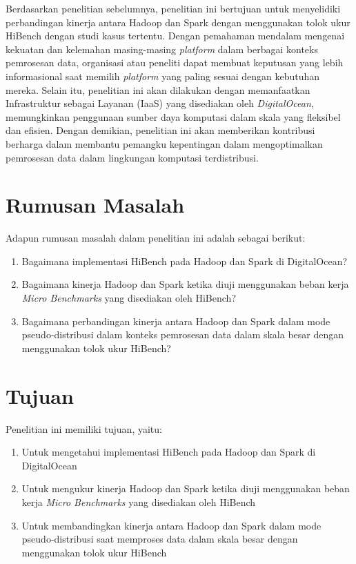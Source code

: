 Berdasarkan penelitian sebelumnya, penelitian ini bertujuan untuk menyelidiki perbandingan kinerja antara Hadoop dan Spark dengan menggunakan tolok ukur HiBench dengan studi kasus tertentu. Dengan pemahaman mendalam mengenai kekuatan dan kelemahan masing-masing \textit{platform} dalam berbagai konteks pemrosesan data, organisasi atau peneliti dapat membuat keputusan yang lebih informasional saat memilih \textit{platform} yang paling sesuai dengan kebutuhan mereka. Selain itu, penelitian ini akan dilakukan dengan memanfaatkan Infrastruktur sebagai Layanan (IaaS) yang disediakan oleh \textit{DigitalOcean}, memungkinkan penggunaan sumber daya komputasi dalam skala yang fleksibel dan efisien. Dengan demikian, penelitian ini akan memberikan kontribusi berharga dalam membantu pemangku kepentingan dalam mengoptimalkan pemrosesan data dalam lingkungan komputasi terdistribusi.

\section{Rumusan Masalah}
Adapun rumusan masalah dalam penelitian ini adalah sebagai berikut:
\begin{enumerate}
	\item Bagaimana implementasi HiBench pada Hadoop dan Spark di DigitalOcean?
	\item Bagaimana kinerja Hadoop dan Spark ketika diuji menggunakan  beban kerja \textit{Micro Benchmarks} yang disediakan oleh HiBench?
	\item Bagaimana perbandingan kinerja antara Hadoop dan Spark dalam mode pseudo-distribusi dalam konteks pemrosesan data dalam skala besar dengan menggunakan tolok ukur HiBench?
\end{enumerate}

\section{Tujuan}
Penelitian ini memiliki tujuan, yaitu:
	\begin{enumerate}
		\item Untuk mengetahui implementasi HiBench pada Hadoop dan Spark di DigitalOcean
		\item Untuk mengukur kinerja Hadoop dan Spark ketika diuji menggunakan  beban kerja \textit{Micro Benchmarks} yang disediakan oleh HiBench
		\item Untuk membandingkan kinerja antara Hadoop dan Spark dalam mode pseudo-distribusi saat memproses data dalam skala besar dengan menggunakan tolok ukur HiBench
	\end{enumerate}

